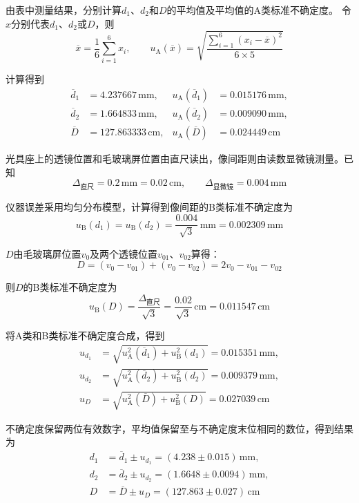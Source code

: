 \documentclass[10pt,a4paper]{ctexart} %
\begin{document}
  由表中测量结果，分别计算$d_1$、$d_2$和$D$的平均值及平均值的A类标准不确定度。
  令$x$分别代表$d_1$、$d_2$或$D$，则
  \[
    \overline{x}=\frac{1}{6}\sum_{i=1}^{6}x_i,\qquad
    u_{\mathrm{A}}(\overline{x})=
    \sqrt{\frac{\sum_{i=1}^{6}(x_i-\overline{x})^2}{6\times5}}
  \]

  计算得到
  \[
    \begin{aligned}
      \overline{d}_1&=4.237667\,\mathrm{mm},
      &u_{\mathrm{A}}(\overline{d}_1)&=0.015176\,\mathrm{mm},\\
      \overline{d}_2&=1.664833\,\mathrm{mm},
      &u_{\mathrm{A}}(\overline{d}_2)&=0.009090\,\mathrm{mm},\\
      \overline{D}&=127.863333\,\mathrm{cm},
      &u_{\mathrm{A}}(\overline{D})&=0.024449\,\mathrm{cm}
    \end{aligned}
  \]

  光具座上的透镜位置和毛玻璃屏位置由直尺读出，像间距则由读数显微镜测量。已知
  \[
    \Delta_{\text{直尺}}=0.2\,\mathrm{mm}=0.02\,\mathrm{cm},\qquad
    \Delta_{\text{显微镜}}=0.004\,\mathrm{mm}
  \]

  仪器误差采用均匀分布模型，计算得到像间距的B类标准不确定度为
  \[
    u_{\mathrm{B}}(d_1)=u_{\mathrm{B}}(d_2)
      =\frac{0.004}{\sqrt{3}}\,\mathrm{mm}
      =0.002309\,\mathrm{mm}
  \]

  $D$由毛玻璃屏位置$v_0$及两个透镜位置$v_{01}$、$v_{02}$算得：
  \[
    D=(v_0-v_{01})+(v_0-v_{02})=2v_0-v_{01}-v_{02}
  \]
  
  则$D$的B类标准不确定度为
  \[
    u_{\mathrm{B}}(D)=\frac{\Delta_{\text{直尺}}}{\sqrt{3}}
       =\frac{0.02}{\sqrt{3}}\,\mathrm{cm}
       =0.011547\,\mathrm{cm}
  \]

  将A类和B类标准不确定度合成，得到
  \[
    \begin{aligned}
      u_{d_1}&=\sqrt{u_{\mathrm{A}}^2(\overline{d}_1)+u_{\mathrm{B}}^2(d_1)}
               =0.015351\,\mathrm{mm},\\
      u_{d_2}&=\sqrt{u_{\mathrm{A}}^2(\overline{d}_2)+u_{\mathrm{B}}^2(d_2)}
               =0.009379\,\mathrm{mm},\\
      u_D&=\sqrt{u_{\mathrm{A}}^2(\overline{D})+u_{\mathrm{B}}^2(D)}
               =0.027039\,\mathrm{cm}
    \end{aligned}
  \]

  不确定度保留两位有效数字，平均值保留至与不确定度末位相同的数位，得到结果为
  \[
    \begin{aligned}
      d_1&=\overline{d}_1\pm u_{d_1}
          =(4.238\pm0.015)\,\mathrm{mm},\\
      d_2&=\overline{d}_2\pm u_{d_2}
          =(1.6648\pm0.0094)\,\mathrm{mm},\\
      D&=\overline{D}\pm u_D
          =(127.863\pm0.027)\,\mathrm{cm}
    \end{aligned}
  \]
\end{document}
